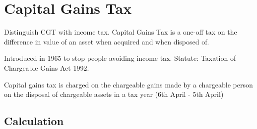 \documentclass[
]{article}
\newenvironment{Shaded}{}{}
\newcommand{\NormalTok}[1]{#1}
\begin{document}
\hypertarget{capital-gains-tax}{%
\section{Capital Gains Tax}\label{capital-gains-tax}}

Distinguish CGT with income tax. Capital Gains Tax is a one-off tax on
the difference in value of an asset when acquired and when disposed of.

Introduced in 1965 to stop people avoiding income tax. Statute: Taxation
of Chargeable Gains Act 1992.

\begin{Shaded}
\begin{Highlighting}[]
\NormalTok{Capital gains tax is charged on the chargeable gains made by a chargeable person on the disposal of chargeable assets in a tax year (6th April {-} 5th April)}
\end{Highlighting}
\end{Shaded}

\hypertarget{calculation-1}{%
\subsection{Calculation}\label{calculation-1}}
\end{document}
